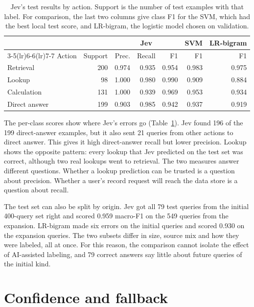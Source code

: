 \documentclass[conference]{IEEEtran}
\begin{document}
\begin{table}[tbp]
\centering\caption{Jev's test results by action. Support is the number of test examples with that label. For comparison, the last two columns give class F1 for the SVM, which had the best local test score, and LR-bigram, the logistic model chosen on validation.}\label{tab:class}
\setlength{\tabcolsep}{4pt}
\begin{tabular}{lrrrrrr}\toprule
&&\multicolumn{3}{c}{Jev}&SVM&LR-bigram\\ \cmidrule(lr){3-5}\cmidrule(lr){6-6}\cmidrule(lr){7-7}
Action & Support & Prec. & Recall & F1 & F1 & F1\\ \midrule
Retrieval &200&0.974&0.935&0.954&0.983&0.975\\
Lookup &98&1.000&0.980&0.990&0.909&0.884\\
Calculation &131&1.000&0.939&0.969&0.953&0.934\\
Direct answer &199&0.903&0.985&0.942&0.937&0.919\\ \bottomrule
\end{tabular}
\end{table}

The per-class scores show where Jev's errors go (Table~\ref{tab:class}). Jev found 196 of the 199 direct-answer examples, but it also sent 21 queries from other actions to direct answer. This gives it high direct-answer recall but lower precision. Lookup shows the opposite pattern: every lookup that Jev predicted on the test set was correct, although two real lookups went to retrieval. The two measures answer different questions. Whether a lookup prediction can be trusted is a question about precision. Whether a user's record request will reach the data store is a question about recall.

The test set can also be split by origin. Jev got all 79 test queries from the initial 400-query set right and scored 0.959 macro-F1 on the 549 queries from the expansion. LR-bigram made six errors on the initial queries and scored 0.930 on the expansion queries. The two subsets differ in size, source mix and how they were labeled, all at once. For this reason, the comparison cannot isolate the effect of AI-assisted labeling, and 79 correct answers say little about future queries of the initial kind.

\section{Confidence and fallback}\label{sec:confidence}
\end{document}
